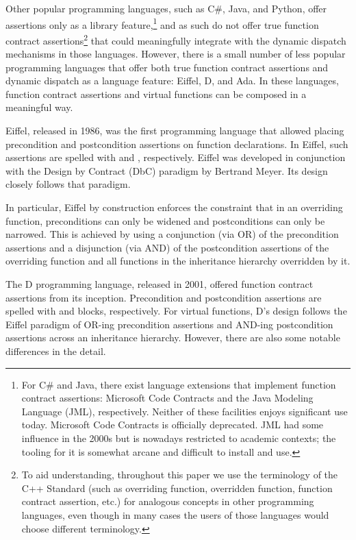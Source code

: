 Other popular programming languages, such as C\#, Java, and Python, offer assertions only as a library feature,\footnote{For C\# and Java, there exist language extensions that implement function contract assertions: Microsoft Code Contracts and the Java Modeling Language (JML), respectively. Neither of these facilities enjoys significant use today. Microsoft Code Contracts is officially deprecated. JML had some influence in the 2000s but is nowadays restricted to academic contexts; the tooling for it is somewhat arcane and difficult to install and use.} and as such do not offer true function contract assertions\footnote{To aid understanding, throughout this paper we use the terminology of the C++ Standard (such as overriding function, overridden function, function contract assertion, etc.) for analogous concepts in other programming languages, even though in many cases the users of those languages would choose different terminology.} that could meaningfully integrate with the  dynamic dispatch mechanisms in those languages. However, there is a small number of less popular programming languages that offer both true function contract assertions and dynamic dispatch as a language feature: Eiffel, D, and Ada. In these languages, function contract assertions and virtual functions can be composed in a meaningful way.

Eiffel, released in 1986, was the first programming language that allowed placing precondition and postcondition assertions on function declarations. In Eiffel, such assertions are spelled with  and , respectively. Eiffel was developed in conjunction with the Design by Contract (DbC) paradigm by Bertrand Meyer. Its design closely follows that paradigm.

In particular, Eiffel by construction enforces the constraint that in an overriding function, preconditions can only be widened and postconditions can only be narrowed. This is achieved by using a conjunction (via OR) of the precondition assertions and a disjunction (via AND) of the postcondition assertions of the overriding function and all functions in the inheritance hierarchy overridden by it.

The D programming language, released in 2001, offered function contract assertions from its inception. Precondition and postcondition assertions are spelled with  and  blocks, respectively. For virtual functions, D's design follows the Eiffel paradigm of OR-ing precondition assertions and AND-ing postcondition assertions across an inheritance hierarchy. However, there are also some notable differences in the detail.

